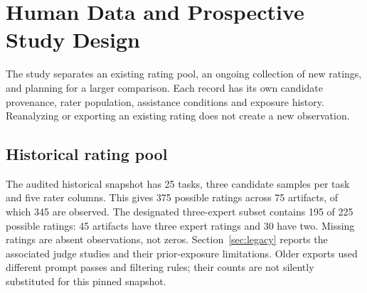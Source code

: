 \section{Human Data and Prospective Study Design}
\label{sec:design}
The study separates an existing rating pool, an ongoing collection of new ratings, and planning for a larger comparison.
Each record has its own candidate provenance, rater population, assistance conditions and exposure history.
Reanalyzing or exporting an existing rating does not create a new observation.

\subsection{Historical rating pool}
The audited historical snapshot has 25 tasks, three candidate samples per task and five rater columns.
This gives 375 possible ratings across 75 artifacts, of which 345 are observed.
The designated three-expert subset contains 195 of 225 possible ratings: 45 artifacts have three expert ratings and 30 have two.
Missing ratings are absent observations, not zeros.
Section~\ref{sec:legacy} reports the associated judge studies and their prior-exposure limitations.
Older exports used different prompt passes and filtering rules; their counts are not silently substituted for this pinned snapshot.

